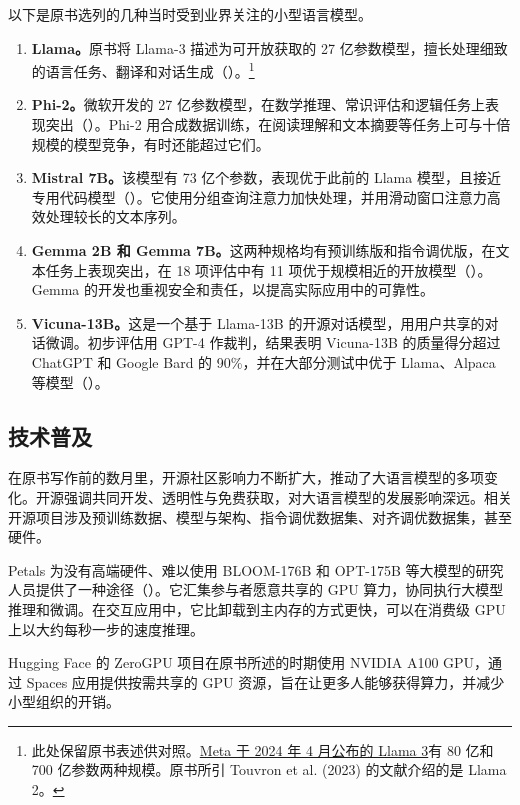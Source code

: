 以下是原书选列的几种当时受到业界关注的小型语言模型。
\begin{enumerate}
\item \textbf{Llama。}原书将 Llama-3 描述为可开放获取的 27 亿参数模型，擅长处理细致的语言任务、翻译和对话生成（）。\footnote{此处保留原书表述供对照。\href{https://ai.meta.com/blog/meta-llama-3/}{Meta 于 2024 年 4 月公布的 Llama 3}有 80 亿和 700 亿参数两种规模。原书所引 Touvron et al. (2023) 的文献介绍的是 Llama 2。}
\item \textbf{Phi-2。}微软开发的 27 亿参数模型，在数学推理、常识评估和逻辑任务上表现突出（）。Phi-2 用合成数据训练，在阅读理解和文本摘要等任务上可与十倍规模的模型竞争，有时还能超过它们。
\item \textbf{Mistral 7B。}该模型有 73 亿个参数，表现优于此前的 Llama 模型，且接近专用代码模型（）。它使用分组查询注意力加快处理，并用滑动窗口注意力高效处理较长的文本序列。
\item \textbf{Gemma 2B 和 Gemma 7B。}这两种规格均有预训练版和指令调优版，在文本任务上表现突出，在 18 项评估中有 11 项优于规模相近的开放模型（）。Gemma 的开发也重视安全和责任，以提高实际应用中的可靠性。
\item \textbf{Vicuna-13B。}这是一个基于 Llama-13B 的开源对话模型，用用户共享的对话微调。初步评估用 GPT-4 作裁判，结果表明 Vicuna-13B 的质量得分超过 ChatGPT 和 Google Bard 的 90\%，并在大部分测试中优于 Llama、Alpaca 等模型（）。
\end{enumerate}

\subsection{技术普及}
在原书写作前的数月里，开源社区影响力不断扩大，推动了大语言模型的多项变化。开源强调共同开发、透明性与免费获取，对大语言模型的发展影响深远。相关开源项目涉及预训练数据、模型与架构、指令调优数据集、对齐调优数据集，甚至硬件。

Petals 为没有高端硬件、难以使用 BLOOM-176B 和 OPT-175B 等大模型的研究人员提供了一种途径（）。它汇集参与者愿意共享的 GPU 算力，协同执行大模型推理和微调。在交互应用中，它比卸载到主内存的方式更快，可以在消费级 GPU 上以大约每秒一步的速度推理。

Hugging Face 的 ZeroGPU 项目在原书所述的时期使用 NVIDIA A100 GPU，通过 Spaces 应用提供按需共享的 GPU 资源，旨在让更多人能够获得算力，并减少小型组织的开销。

